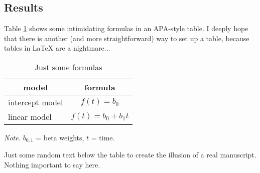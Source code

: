 
 \subsection{Results}

Table \ref{tab:models} shows some intimidating formulas in an APA-style table. I deeply hope that there is another (and more straightforward) way to set up a table, because tables in LaTeX are a nightmare...

\begin{table}[htbp]
  \centering
  \vspace*{2em}
  \begin{threeparttable}
    \caption{Just some formulas}
    \label{tab:models}
    \begin{tabular}{@{}lc@{}}
      \toprule
        \multicolumn{1}{c}{\textbf{model}}  & \multicolumn{1}{c}{\textbf{formula}} \\
      \midrule
        intercept model & \multicolumn{1}{c}{$f(t) = b_{0}$} \\
        linear model &   \multicolumn{1}{c}{$f(t) = b_{0} + b_{1}t$} \\
      \midrule
    \end{tabular}
    \begin{tablenotes}
      {\small\textit{Note.} $b_{0,1}$ = beta weights,  $t$ = time.}
    \end{tablenotes}
  \end{threeparttable}
\end{table}

Just some random text below the table to create the illusion of a real manuscript. Nothing important to say here.
